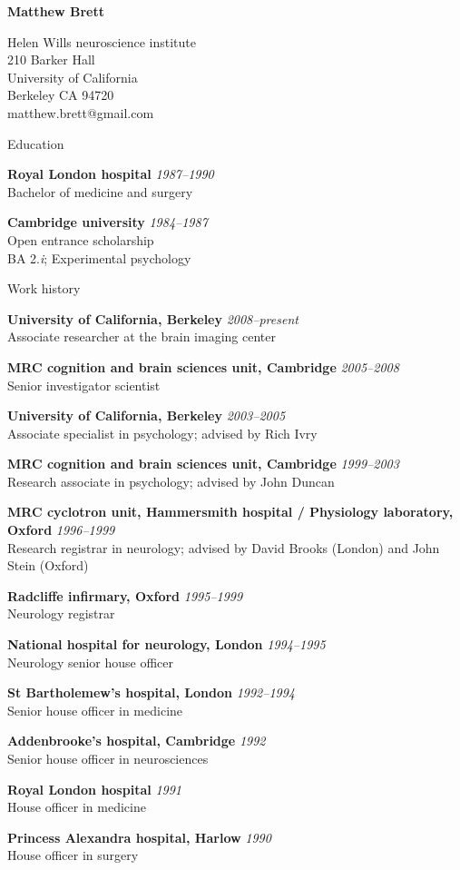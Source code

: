 \documentclass{cv}
\newcommand{\PlaceDate}[2]{{\bf #1} \hfill {\em #2} \\}
\newcommand{\PlaceDateNote}[3]{{\bf #1} \hfill {\em #2} \\#3}
\newcommand{\UCB}{University of California, Berkeley}
\newcommand{\CBU}{MRC cognition and brain sciences unit, Cambridge}
\begin{document}
\nocite{*}

{\huge \bf Matthew Brett}

Helen Wills neuroscience institute \\
210 Barker Hall \\
University of California \\
Berkeley CA 94720 \\
matthew.brett@gmail.com

\begin{cvSection}{Education}

\PlaceDate{Royal London hospital}{1987--1990 }
Bachelor of medicine and surgery

\PlaceDateNote{Cambridge university}{1984--1987 }{
Open entrance scholarship \\
BA 2.{\em i}; Experimental psychology}

\end{cvSection}

\begin{cvSection}{Work history}

\PlaceDateNote{\UCB}{2008--present }{
Associate researcher at the brain imaging center}

\PlaceDateNote{\CBU}{2005--2008}{
Senior investigator scientist}

\PlaceDateNote{\UCB}{2003--2005 }{
Associate specialist in psychology; advised by Rich Ivry}

\PlaceDateNote{\CBU}{1999--2003 }{
Research associate in psychology; advised by John Duncan}

\PlaceDateNote{
MRC cyclotron unit, Hammersmith hospital / Physiology laboratory, Oxford}
{1996--1999}
{Research registrar in neurology; advised by David Brooks (London) and John
Stein (Oxford)}

\PlaceDateNote{Radcliffe infirmary, Oxford}
{1995--1999}
{Neurology registrar}

\PlaceDateNote{National hospital for neurology, London}{1994--1995 }{
Neurology senior house officer}

\PlaceDateNote{St Bartholemew's hospital, London}{1992--1994 }{
Senior house officer in medicine}

\PlaceDateNote{Addenbrooke's hospital, Cambridge}{1992 }{
Senior house officer in neurosciences}

\PlaceDateNote{Royal London hospital}{1991 }{
House officer in medicine}

\PlaceDateNote{Princess Alexandra hospital, Harlow}{1990 }{
House officer in surgery}

\end{cvSection}
\end{document}
